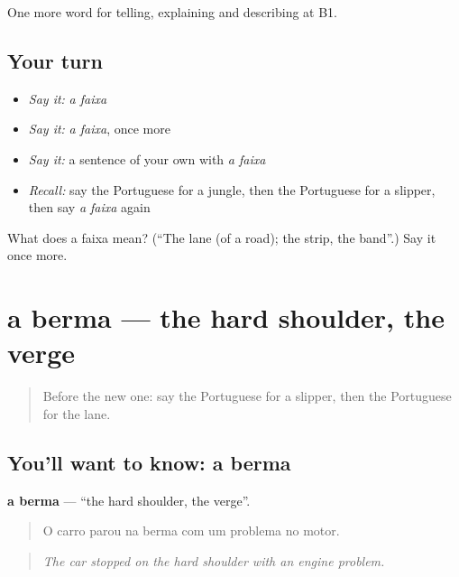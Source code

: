 \begin{grammarlens}[title={What you've built}]
One more word for telling, explaining and describing at B1.
\end{grammarlens}

\subsection*{Your turn}
\begin{itemize}
\raggedright
  \item \emph{Say it:} \emph{a faixa}
  \item \emph{Say it:} \emph{a faixa}, once more
  \item \emph{Say it:} a sentence of your own with \emph{a faixa}
  \item \emph{Recall:} say the Portuguese for a jungle, then the Portuguese for a slipper, then say \emph{a faixa} again
\end{itemize}

\begin{tcolorbox}[breakable,colback=teal!4,colframe=teal!35!black,title={Before you move on}]
What does a faixa mean? (\textquotedblleft{}The lane (of a road); the strip, the band\textquotedblright{}.) Say it once more.
\end{tcolorbox}
\section[a berma]{a berma — the hard shoulder, the verge}

\label{lesson:PT-C401-berma}



\begin{quote}
Before the new one: say the Portuguese for a slipper, then the Portuguese for the lane.
\end{quote}

\subsection*{You'll want to know: a berma}
\textbf{a berma} — \textquotedblleft{}the hard shoulder, the verge\textquotedblright{}.

\begin{quote}
O carro parou na berma com um problema no motor.
\end{quote}

\begin{quote}
\emph{The car stopped on the hard shoulder with an engine problem.}
\end{quote}

